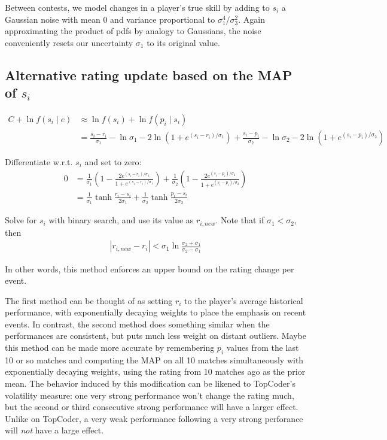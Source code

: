 \documentclass{article}
\begin{document}
Between contests, we model changes in a player's true skill by adding to $s_i$ a Gaussian noise with mean $0$ and variance proportional to $\sigma_1^4 / \sigma_3^2$. Again approximating the product of pdfs by analogy to Gaussians, the noise conveniently resets our uncertainty $\sigma_1$ to its original value.

\subsection{Alternative rating update based on the MAP of $s_i$}

\begin{align}
C + \ln f(s_i \mid e) &\approx \ln f(s_i) + \ln f(p_i\mid s_i)
\\&= \frac{s_i-r_i}{\sigma_1} - \ln \sigma_1 - 2\ln\left(1 + e^{(s_i-r_i)/\sigma_1} \right)
	+\frac{s_i-p_i}{\sigma_2} - \ln \sigma_2 - 2\ln\left(1 + e^{(s_i-p_i)/\sigma_2} \right)
\end{align}

Differentiate w.r.t. $s_i$ and set to zero:
\begin{align}
0 &= \frac{1}{\sigma_1}\left( 1 - \frac {2e^{(s_i-r_i)/\sigma_1}} {1 + e^{(s_i-r_i)/\sigma_1}} \right)
	+ \frac{1}{\sigma_2}\left( 1 - \frac {2e^{(s_i-p_i)/\sigma_2}} {1 + e^{(s_i-p_i)/\sigma_2}} \right)
\\ &= \frac{1}{\sigma_1} \tanh \frac {r_i-s_i} {2\sigma_1}
	+ \frac{1}{\sigma_2} \tanh \frac {p_i-s_i} {2\sigma_2}
\end{align}

Solve for $s_i$ with binary search, and use its value as $r_{i,new}$. Note that if $\sigma_1 < \sigma_2$, then
\begin{align}
|r_{i,new} - r_i| < \sigma_1 \ln\frac {\sigma_2+\sigma_1} {\sigma_2-\sigma_1}
\end{align}

In other words, this method enforces an upper bound on the rating change per event.

The first method can be thought of as setting $r_i$ to the player's average historical performance, with exponentially decaying weights to place the emphasis on recent events. In contrast, the second method does something similar when the performances are consistent, but puts much less weight on distant outliers. Maybe this method can be made more accurate by remembering $p_i$ values from the last 10 or so matches and computing the MAP on all 10 matches simultaneously with exponentially decaying weights, using the rating from 10 matches ago as the prior mean. The behavior induced by this modification can be likened to TopCoder's volatility measure: one very strong performance won't change the rating much, but the second or third consecutive strong performance will have a larger effect. Unlike on TopCoder, a very weak performance following a very strong perforance will \emph{not} have a large effect.
\end{document}
